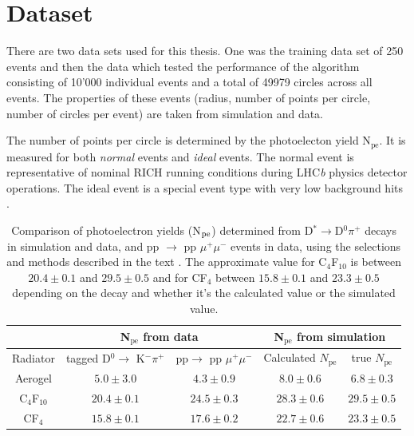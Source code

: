 \documentclass[11pt,twoside]{scrreprt}
\begin{document}

\section{Dataset} %
\label{sec:dataset}
There are two data sets used for this thesis. One was the training data set of 250 events and then the data which tested the performance of the algorithm consisting of 10'000
individual events and a total of 49979 circles across all events. The properties of these events (radius, number of points per circle, number of circles per event) are taken from simulation and data.

The number of points per circle is determined by the photoelecton yield N$_\text{pe}$. It is measured for both \emph{normal} events and \emph{ideal}
events. The normal event is representative of nominal RICH running conditions during LHC\textit{b} physics detector operations. The ideal event is
a special event type with very low background hits \cite{RICHPerf2012}.

\begin{table}[tb]
\centering
\begin{tabular}{|c| c| c | c |c|}
\hline\hline
 & \multicolumn{2}{|c|}{N$_{\text{pe}}$ from data} & \multicolumn{2}{|c|}{N$_{\text{pe}}$ from simulation} \\ \hline
Radiator &  tagged D$^0 \rightarrow$ K$^- \pi^+$ &pp$ \rightarrow$ pp $\mu^+ \mu^-$ & Calculated $N_{\text{pe}}$ & true $N_{\text{pe}}$ \\ [0.5ex]
\hline
Aerogel & $5.0 \pm 3.0$  & $4.3 \pm 0.9$& $8.0 \pm 0.6$ & $6.8 \pm 0.3$ \\ \hline
C$_4$F$_{10}$  & $20.4 \pm 0.1$ & $24.5 \pm 0.3$& $28.3 \pm 0.6$ & $29.5 \pm 0.5$ \\ \hline
CF$_4$ & $ 15.8 \pm 0.1$  & $ 17.6 \pm 0.2$& $22.7 \pm 0.6$ & $23.3 \pm 0.5$ \\ 
\hline
\end{tabular}
\caption[Comparison of photoelectron yields (N$_{\rm pe}$)]{Comparison of photoelectron yields (N$_{\rm pe}$) determined from
D$^* \rightarrow$D$^0\pi^+$ decays in simulation and data, and 
pp $\rightarrow$ pp $\mu^+ \mu^-$ events in data, using the selections and 
methods described in the text \cite{RICHPerf2012}. The approximate value for 
C$_4$F$_{10}$ is between  $20.4 \pm 0.1$ and $29.5 \pm 0.5$ and for CF$_4$ between
$ 15.8 \pm 0.1$ and $23.3 \pm 0.5$ depending on the decay and whether it's the 
calculated value or the simulated value.}
\label{table:results}
\end{table}
\end{document}

